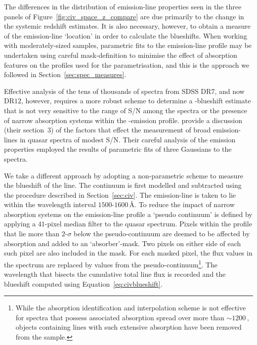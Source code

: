 The differences in the distribution of  emission-line properties seen in the three panels of Figure~\ref{fig:civ_space_z_compare} are due primarily to the change in the systemic redshift estimates. 
It is also necessary, however, to obtain a measure of the  emission-line `location' in order to calculate the blueshifts. 
When working with moderately-sized samples, parametric fits to the emission-line profile may be undertaken using careful mask-definition to minimise the effect of absorption features on the profiles used for the parametrisation, and this is the approach we followed in Section~\ref{sec:spec_measures}.

Effective analysis of the tens of thousands of spectra from SDSS DR$7$, and now DR$12$, however, requires a more robust scheme to determine a -blueshift estimate that is not very sensitive to the range of S/N among the spectra or the presence of narrow absorption systems within the -emission profile. 
\citet{shen11} provide a discussion (their section~3) of the factors that effect the measurement of broad emission-lines in quasar spectra of modest S/N. 
Their careful analysis of the  emission properties employed the results of parametric fits of three Gaussians to the spectra. 

We take a different approach by adopting a non-parametric scheme to measure the blueshift of the  line. 
The continuum is first modelled and subtracted using the procedure described in Section~\ref{sec:civ}. 
The  emission-line is taken to lie within the wavelength interval $1500$-$1600$\,\AA. 
To reduce the impact of narrow absorption systems on the emission-line profile a `pseudo continuum' is defined by applying a $41$-pixel median filter to the quasar spectrum.
Pixels within the  profile that lie more than $2$-$\sigma$ below the pseudo-continuum are deemed to be affected by absorption and added to an `absorber'-mask. 
Two pixels on either side of each such pixel are also included in the mask. 
For each masked pixel, the flux values in the spectrum are replaced by values from the pseudo-continuum\footnote{While the absorption identification and interpolation scheme is not effective for spectra that possess
associated absorption spread over more than $\sim1200$\,\kms, objects containing  lines with such extensive absorption have been removed from the sample.}. 
The wavelength that bisects the cumulative total line flux is recorded and the blueshift computed using Equation~\ref{eq:civblueshift}. 

